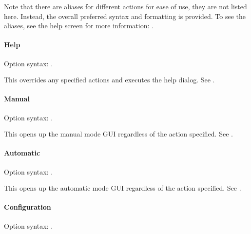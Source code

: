 \documentclass[letterpaper,11pt,english]{sphinxmanual}
\begin{document}
\sphinxAtStartPar
Note that there are aliases for different actions for ease of use, they
are not listed here. Instead, the overall preferred syntax and formatting
is provided. To see the aliases, see the help screen for more information:
{\hyperref[\detokenize{user/command_line:user-command-line-available-actions-help}]{}}.


\paragraph{Help}
\label{\detokenize{user/command_line:id1}}
\sphinxAtStartPar
Option syntax: .

\sphinxAtStartPar
This overrides any specified actions and executes the help dialog. See
{\hyperref[\detokenize{user/command_line:user-command-line-available-actions-help}]{}}.


\paragraph{Manual}
\label{\detokenize{user/command_line:id2}}
\sphinxAtStartPar
Option syntax: .

\sphinxAtStartPar
This opens up the manual mode GUI regardless of the action specified. See {\hyperref[\detokenize{user/command_line:user-command-line-available-actions-manual}]{}}.


\paragraph{Automatic}
\label{\detokenize{user/command_line:id3}}
\sphinxAtStartPar
Option syntax: .

\sphinxAtStartPar
This opens up the automatic mode GUI regardless of the action specified. See {\hyperref[\detokenize{user/command_line:user-command-line-available-actions-automatic}]{}}.


\paragraph{Configuration}
\label{\detokenize{user/command_line:configuration}}\label{\detokenize{user/command_line:user-command-line-available-options-configuration}}
\sphinxAtStartPar
Option syntax: .
\end{document}
